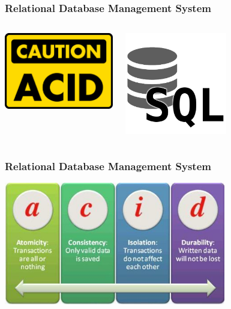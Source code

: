 \documentclass{beamer}
\begin{document}
\begin{frame}
  \frametitle{Relational Database Management System}

  \begin{columns}[c]
    \begin{center}
      \includegraphics[height=9em]{caution_acid.png}
    \end{center}

    \begin{center}
      \includegraphics[height=12em]{sql.png}
    \end{center}
  \end{columns}
\end{frame}

\begin{frame}
  \frametitle{Relational Database Management System}

  \begin{center}
    \includegraphics[height=2.1in]{acid-details.jpg}
  \end{center}
\end{frame}
\end{document}
